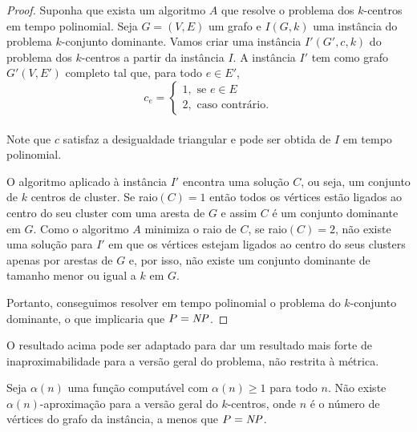 \begin{proof}
    Suponha que exista um algoritmo $A$ que resolve o problema dos $k$-centros em tempo polinomial. Seja $G = (V,E)$ um grafo e $I(G,k)$ uma instância do problema $k$-conjunto dominante. Vamos criar uma instância $I'(G',c,k)$ do problema dos $k$-centros a partir da instância $I$. A instância $I'$ tem como grafo $G'(V,E')$ completo tal que, para todo $e \in E'$,
    \[
    c_e = \begin{cases}
            1, \text{ se } e \in E \\
            2, \text{ caso contrário.} 
            \end{cases}\]\\
    Note que $c$ satisfaz a desigualdade triangular e pode ser obtida de $I$ em tempo polinomial.

    O algoritmo aplicado à instância $I'$ encontra uma solução $C$, ou seja, um conjunto de $k$ centros de cluster. Se raio$(C)=1$ então todos os vértices estão ligados ao centro do seu cluster com uma aresta de $G$ e assim $C$ é um conjunto dominante em $G$. 
    Como o algoritmo $A$ minimiza o raio de $C$, se raio$(C)=2$, não existe uma solução para $I'$ em que os vértices estejam ligados ao centro do seus clusters apenas por arestas de $G$ e, por isso, não existe um conjunto dominante de tamanho menor ou igual a $k$ em $G$.

    Portanto, conseguimos resolver em tempo polinomial o problema do $k$-conjunto dominante, o que implicaria que $P = \mathit{NP}$.
\end{proof}

O resultado acima pode ser adaptado para dar um resultado mais forte de inaproximabilidade para a versão geral do problema, não restrita à métrica.
\begin{theorem}
    Seja $\alpha(n)$ uma função computável com $\alpha(n)\geq 1$ para todo $n$. Não existe $\alpha(n)$-aproximação para a versão geral do $k$-centros, onde $n$ é o número de vértices do grafo da instância, a menos que $P=\mathit{NP}$.
\end{theorem}

